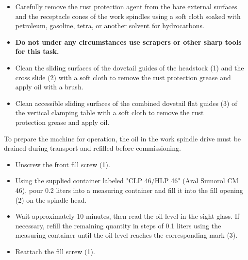 \begin{itemize}
    \item Carefully remove the rust protection agent from the bare external surfaces and the receptacle cones of the work spindles using a soft cloth soaked with petroleum, gasoline, tetra, or another solvent for hydrocarbons.
    \item \textbf{Do not under any circumstances use scrapers or other sharp tools for this task.}
    \item Clean the sliding surfaces of the dovetail guides of the headstock (1) and the cross slide (2) with a soft cloth to remove the rust protection grease and apply oil with a brush.\footnotemark[2]
    \item Clean accessible sliding surfaces of the combined dovetail flat guides (3) of the vertical clamping table with a soft cloth to remove the rust\\ protection grease and apply oil.
\end{itemize}




To prepare the machine for operation, the oil in the work spindle drive must be drained during transport and refilled before commissioning.

\vspace{.5cm}



\begin{itemize}[itemsep=0.5em]
    \item Unscrew the front fill screw (1).
    \item Using the supplied container labeled "CLP 46/HLP 46" (Aral Sumorol CM 46), pour 0.2 liters into a measuring container and fill it into the fill opening (2) on the spindle head.
    \item Wait approximately 10 minutes, then read the oil level in the sight glass. If necessary, refill the remaining quantity in steps of 0.1 liters using the measuring container until the oil level reaches the corresponding mark (3).
    \item Reattach the fill screw (1).
\end{itemize}

